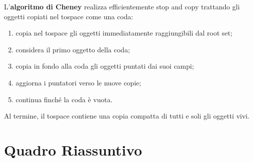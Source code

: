 \documentclass{article}
\begin{document}
L'\textbf{algoritmo di Cheney} realizza efficientemente stop and copy trattando gli oggetti copiati nel tospace come una coda:
\begin{enumerate}
  \item copia nel tospace gli oggetti immediatamente raggiungibili dal root set;
  \item considera il primo oggetto della coda;
  \item copia in fondo alla coda gli oggetti puntati dai suoi campi;
  \item aggiorna i puntatori verso le nuove copie;
  \item continua finché la coda è vuota.
\end{enumerate}

Al termine, il tospace contiene una copia compatta di tutti e soli gli oggetti vivi.

\section{Quadro Riassuntivo}
\end{document}
